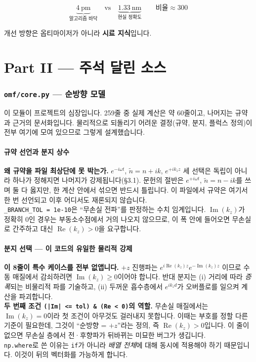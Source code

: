 \documentclass[10pt,a4paper]{article}
\newcommand{\note}[1]{%
  \begin{tcolorbox}[enhanced,breakable,colback=white,colframe=accent,
    boxrule=0pt,leftrule=1.6pt,arc=0pt,outer arc=0pt,
    left=6pt,right=2pt,top=3pt,bottom=3pt,boxsep=0pt,
    before skip=5pt, after skip=8pt]
  #1
  \end{tcolorbox}}
\newcommand{\nt}{\tilde n}
\newcommand{\Imag}{\operatorname{Im}}
\newcommand{\Real}{\operatorname{Re}}
\begin{document}
\begin{equation*}
\underbrace{4\ \text{pm}}_{\text{알고리즘 바닥}}\quad\text{vs}\quad\underbrace{1.33\ \text{nm}}_{\text{현실 정확도}}\qquad\text{비율}\approx300
\end{equation*}

개선 방향은 옵티마이저가 아니라 \textbf{시료 지식}입니다.

\newpage

\part*{\color{accent}Part II — 주석 달린 소스}

\section{\texttt{omf/core.py} — 순방향 모델}

이 모듈이 프로젝트의 심장입니다. 259줄 중 실제 계산은 약 60줄이고, 나머지는 규약과
근거의 문서화입니다. 물리적으로 되돌리기 어려운 결정(규약, 분지, 플럭스 정의)이
전부 여기에 모여 있으므로 그렇게 설계했습니다.

\subsection{규약 선언과 분지 상수}

\note{
\textbf{왜 규약을 파일 최상단에 못 박는가.} $e^{-i\omega t}$, $\nt=n+ik$, $e^{+ik_z z}$
세 선택은 독립이 아니라 하나가 정해지면 나머지가 강제됩니다(§3.1). 문헌의 절반은
$e^{+i\omega t}$, $\nt=n-ik$를 쓰며 둘 다 옳지만, 한 계산 안에서 섞으면 반드시 틀립니다.
이 파일에서 규약은 여기서 한 번 선언되고 이후 어디서도 재론되지 않습니다.\\[4pt]
\texttt{\_BRANCH\_TOL = 1e-10}은 ``무손실 전파''를 판정하는 수치 임계입니다.
$\Imag(k_z)$가 정확히 0인 경우는 부동소수점에서 거의 나오지 않으므로, 이 폭 안에
들어오면 무손실로 간주하고 대신 $\Real(k_z)>0$을 요구합니다.
}
\subsection{분지 선택 — 이 코드의 유일한 물리적 강제}

\note{
\textbf{이 8줄이 특수 케이스를 전부 없앱니다.} $+z$ 진행파는 $e^{i\Real(k_z)z}e^{-\Imag(k_z)z}$
이므로 수동 매질에서 감쇠하려면 $\Imag(k_z)\ge0$이어야 합니다. 반대 분지는
(i) 거리에 따라 \emph{증폭}되는 비물리적 파를 기술하고,
(ii) 두꺼운 흡수층에서 $e^{ik_zd}$가 오버플로를 일으켜 계산을 파괴합니다.\\[4pt]
\textbf{두 번째 조건 \texttt{(|Im| <= tol) \& (Re < 0)}의 역할.} 무손실 매질에서는
$\Imag(k_z)=0$이라 첫 조건이 아무것도 걸러내지 못합니다. 이때는 부호를 정할 다른 기준이
필요한데, 그것이 ``순방향 = $+z$''라는 정의, 즉 $\Real(k_z)>0$입니다. 이 줄이 없으면
무손실 층에서 전·후향파가 뒤바뀌는 미묘한 버그가 생깁니다.\\[4pt]
\texttt{np.where}로 쓴 이유는 \texttt{if}가 아니라 \emph{배열 전체}에 대해 동시에
적용해야 하기 때문입니다. 이것이 뒤의 벡터화를 가능하게 합니다.
}
\end{document}
